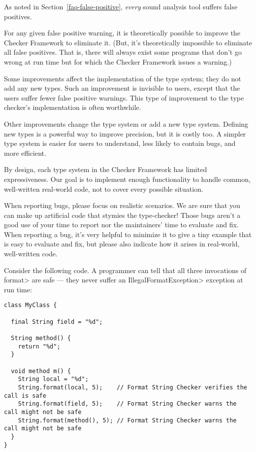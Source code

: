 
As noted in Section~\ref{faq-false-positive}, \emph{every} sound analysis
tool suffers false positives.

For any given false positive warning, it is theoretically possible to
improve the Checker Framework to eliminate it.  (But, it's theoretically
impossible to eliminate all false positives.  That is, there
will always exist some programs that don't go wrong at run time but for
which the Checker Framework issues a warning.)

Some improvements affect the implementation of the type system; they do not
add any new types.  Such an improvement is invisible to users, except that
the users suffer fewer false positive warnings.  This type of improvement
to the type checker's implementation is often worthwhile.

Other improvements change the type system or add a new type system.
Defining new types is a powerful way to improve precision, but it is costly
too.  A simpler type system is easier for users to understand, less likely
to contain bugs, and more efficient.

By design, each type system in the Checker Framework has limited
expressiveness.  Our goal is to implement enough functionality to handle
common, well-written real-world code, not to cover every possible
situation.

When reporting bugs, please focus on realistic scenarios.  We are sure that
you can make up artificial code that stymies the type-checker!  Those bugs
aren't a good use of your time to report nor the maintainers' time to
evaluate and fix.  When reporting a bug, it's very helpful to minimize it
to give a tiny example that is easy to evaluate and fix, but please also
indicate how it arises in real-world, well-written code.



Consider the following code.  A programmer can tell that all three
invocations of \<format> are safe --- they never suffer an
\<IllegalFormatException> exception at run time:

\begin{Verbatim}
class MyClass {

  final String field = "%d";

  String method() {
    return "%d";
  }

  void method m() {
    String local = "%d";
    String.format(local, 5);    // Format String Checker verifies the call is safe
    String.format(field, 5);    // Format String Checker warns the call might not be safe
    String.format(method(), 5); // Format String Checker warns the call might not be safe
  }
}
\end{Verbatim}

